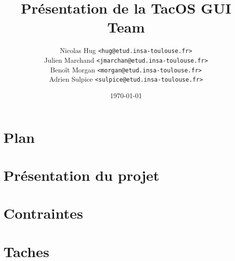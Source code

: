 \documentclass[12pt]{beamer}
\title{Présentation de la TacOS GUI Team}
\author{Nicolas Hug \texttt{<hug@etud.insa-toulouse.fr>}\\
Julien Marchand \texttt{<jmarchan@etud.insa-toulouse.fr>}\\
Benoît Morgan \texttt{<morgan@etud.insa-toulouse.fr>}\\
Adrien Sulpice \texttt{<sulpice@etud.insa-toulouse.fr>}}
\institute{INSA de Toulouse}
\date{\today}
\begin{document}

\frame{\titlepage}

\section[Plan]{Plan}
\frame{\tableofcontents}

\section{Présentation du projet}


\section{Contraintes}

\section{Taches}

\end{document}
